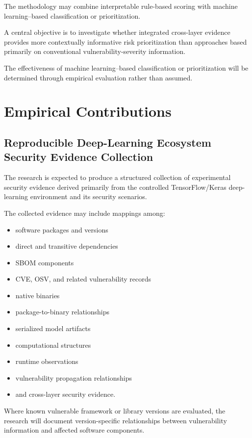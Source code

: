\documentclass[
  12pt,
  letterpaper,
  oneside]{report}
\providecommand{\tightlist}{%
  \setlength{\itemsep}{0pt}\setlength{\parskip}{0pt}}
\begin{document}
The methodology may combine interpretable rule-based scoring with
machine learning--based classification or prioritization.

A central objective is to investigate whether integrated cross-layer
evidence provides more contextually informative risk prioritization than
approaches based primarily on conventional vulnerability-severity
information.

The effectiveness of machine learning--based classification or
prioritization will be determined through empirical evaluation rather
than assumed.

\section{Empirical Contributions}\label{123-empirical-contributions}

\subsection{Reproducible Deep-Learning Ecosystem Security Evidence Collection}\label{1231-reproducible-deep-learning-ecosystem-security-evidence-collection}

The research is expected to produce a structured collection of
experimental security evidence derived primarily from the controlled
TensorFlow/Keras deep-learning environment and its security scenarios.

The collected evidence may include mappings among:

\begin{itemize}
\tightlist
\item
  software packages and versions
\item
  direct and transitive dependencies
\item
  SBOM components
\item
  CVE, OSV, and related vulnerability records
\item
  native binaries
\item
  package-to-binary relationships
\item
  serialized model artifacts
\item
  computational structures
\item
  runtime observations
\item
  vulnerability propagation relationships
\item
  and cross-layer security evidence.
\end{itemize}

Where known vulnerable framework or library versions are evaluated, the
research will document version-specific relationships between
vulnerability information and affected software components.
\end{document}
